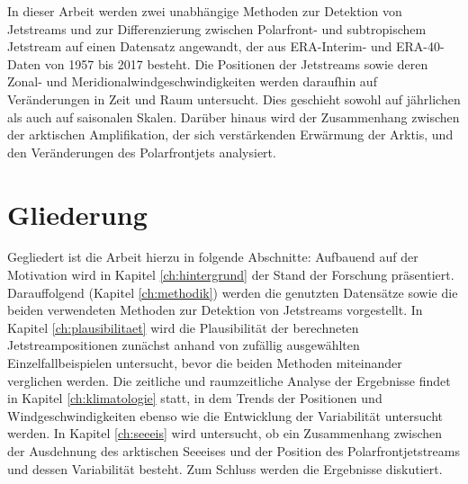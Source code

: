In dieser Arbeit werden zwei unabhängige Methoden zur Detektion von Jetstreams und zur Differenzierung zwischen Polarfront- und subtropischem Jetstream auf einen Datensatz angewandt, der aus ERA-Interim- und ERA-40-Daten von 1957 bis 2017 besteht. Die Positionen der Jetstreams sowie deren Zonal- und Meridionalwindgeschwindigkeiten werden daraufhin auf Veränderungen in Zeit und Raum untersucht. Dies geschieht sowohl auf jährlichen als auch auf saisonalen Skalen. Darüber hinaus wird der Zusammenhang zwischen der arktischen Amplifikation, der sich verstärkenden Erwärmung der Arktis, und den Veränderungen des Polarfrontjets analysiert.

\section*{Gliederung}
Gegliedert ist die Arbeit hierzu in folgende Abschnitte: Aufbauend auf der Motivation wird in Kapitel \ref{ch:hintergrund} der Stand der Forschung präsentiert. Darauffolgend (Kapitel \ref{ch:methodik}) werden die genutzten Datensätze sowie die beiden verwendeten Methoden zur Detektion von Jetstreams vorgestellt. In Kapitel \ref{ch:plausibilitaet} wird die Plausibilität der berechneten Jetstreampositionen zunächst anhand von zufällig ausgewählten Einzelfallbeispielen untersucht, bevor die beiden Methoden miteinander verglichen werden. Die zeitliche und raumzeitliche Analyse der Ergebnisse findet in Kapitel \ref{ch:klimatologie} statt, in dem Trends der Positionen und Windgeschwindigkeiten ebenso wie die Entwicklung der Variabilität untersucht werden. In Kapitel \ref{ch:seeeis} wird untersucht, ob ein Zusammenhang zwischen der Ausdehnung des arktischen Seeeises und der Position des Polarfrontjetstreams und dessen Variabilität besteht. Zum Schluss werden die Ergebnisse diskutiert.
